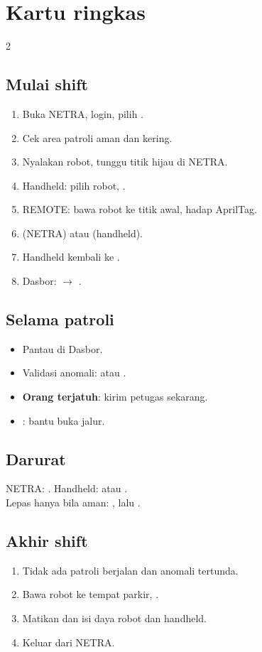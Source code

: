 \documentclass[11pt]{article}
\newcommand{\ra}{\ensuremath{\rightarrow}}
\begin{document}
\section{Kartu ringkas}
\label{sec:kartu}
\begin{multicols}{2}
\subsection*{Mulai shift}
\begin{enumerate}
  \item Buka NETRA, login, pilih .
  \item Cek area patroli aman dan kering.
  \item Nyalakan robot, tunggu titik hijau di NETRA.
  \item Handheld: pilih robot, .
  \item REMOTE: bawa robot ke titik awal, hadap AprilTag.
  \item {} (NETRA) atau  (handheld).
  \item Handheld kembali ke .
  \item Dasbor:  \ra{} .
\end{enumerate}

\subsection*{Selama patroli}
\begin{itemize}
  \item Pantau  di Dasbor.
  \item Validasi anomali:  atau .
  \item \textcolor{dangerc}{\textbf{Orang terjatuh}}: kirim petugas sekarang.
  \item {}: bantu buka jalur.
\end{itemize}

\columnbreak
\subsection*{Darurat}
\begin{penting}
NETRA: . Handheld:  atau .\\[3pt]
Lepas hanya bila aman: , lalu .
\end{penting}

\subsection*{Akhir shift}
\begin{enumerate}
  \item Tidak ada patroli berjalan dan anomali tertunda.
  \item Bawa robot ke tempat parkir, .
  \item Matikan dan isi daya robot dan handheld.
  \item Keluar dari NETRA.
\end{enumerate}


\end{multicols}
\end{document}
